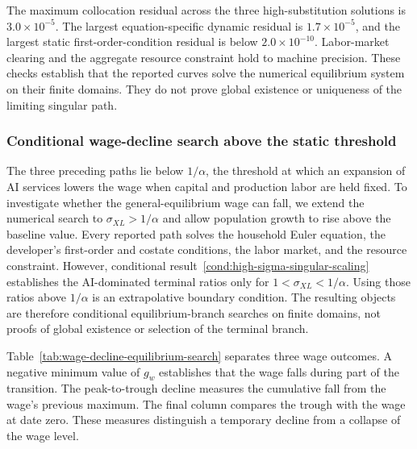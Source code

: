 The maximum collocation residual across the three high-substitution solutions is
$3.0\times10^{-5}$. The largest equation-specific dynamic residual is
$1.7\times10^{-5}$, and the largest static first-order-condition residual is below
$2.0\times10^{-10}$. Labor-market clearing and the aggregate resource constraint
hold to machine precision. These checks establish that the reported curves solve
the numerical equilibrium system on their finite domains. They do not prove global
existence or uniqueness of the limiting singular path.

\subsubsection{Conditional wage-decline search above the static threshold}

The three preceding paths lie below $1/\alpha$, the threshold at which an expansion
of AI services lowers the wage when capital and production labor are held fixed. To
investigate whether the general-equilibrium wage can fall, we extend the numerical
search to $\sigma_{XL}>1/\alpha$ and allow population growth to rise above the
baseline value. Every reported path solves the household Euler equation, the
developer's first-order and costate conditions, the labor market, and the resource
constraint. However, conditional
result~\ref{cond:high-sigma-singular-scaling} establishes the AI-dominated terminal
ratios only for $1<\sigma_{XL}<1/\alpha$. Using those ratios above $1/\alpha$ is an
extrapolative boundary condition. The resulting objects are therefore conditional
equilibrium-branch searches on finite domains, not proofs of global existence or
selection of the terminal branch.

Table~\ref{tab:wage-decline-equilibrium-search} separates three wage outcomes. A
negative minimum value of $g_w$ establishes that the wage falls during part of the
transition. The peak-to-trough decline measures the cumulative fall from the wage's
previous maximum. The final column compares the trough with the wage at date zero.
These measures distinguish a temporary decline from a collapse of the wage level.


